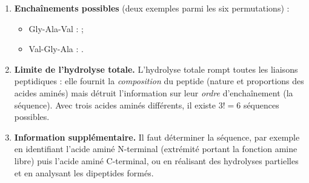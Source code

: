 \documentclass[11pt]{article}
\newcommand{\cle}[1]{{\popxbold\color{popdark}#1}}
\begin{document}
\begin{corrige}
\begin{enumerate}
\item \textbf{Enchaînements possibles} (deux exemples parmi les six permutations) :
\begin{itemize}
\item Gly-Ala-Val :  ;
\item Val-Gly-Ala : .
\end{itemize}
\item \textbf{Limite de l'hydrolyse totale.} L'hydrolyse totale rompt toutes les liaisons peptidiques : elle fournit la \emph{composition} du peptide (nature et proportions des acides aminés) mais détruit l'information sur leur \emph{ordre} d'enchaînement (la séquence). Avec trois acides aminés différents, il existe $3! = 6$ séquences possibles.
\item \textbf{Information supplémentaire.} Il faut déterminer la séquence, par exemple en identifiant l'acide aminé \cle{N-terminal} (extrémité portant la fonction amine libre) puis l'acide aminé \cle{C-terminal}, ou en réalisant des hydrolyses partielles et en analysant les dipeptides formés.
\end{enumerate}
\end{corrige}
\end{document}
